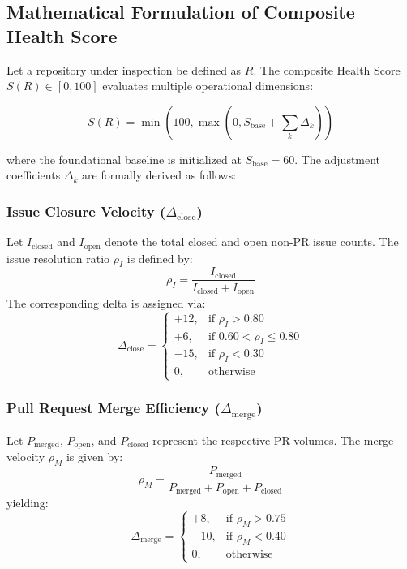\documentclass[conference]{IEEEtran}
\begin{document}
\subsection{Mathematical Formulation of Composite Health Score}
Let a repository under inspection be defined as $R$. The composite Health Score $S(R) \in [0, 100]$ evaluates multiple operational dimensions:

\begin{equation}
S(R) = \min\left(100, \max\left(0, S_{\text{base}} + \sum_{k} \Delta_k \right)\right)
\label{eq:health}
\end{equation}

where the foundational baseline is initialized at $S_{\text{base}} = 60$. The adjustment coefficients $\Delta_k$ are formally derived as follows:

\subsubsection{Issue Closure Velocity ($\Delta_{\text{close}}$)}
Let $I_{\text{closed}}$ and $I_{\text{open}}$ denote the total closed and open non-PR issue counts. The issue resolution ratio $\rho_I$ is defined by:
\begin{equation}
\rho_I = \frac{I_{\text{closed}}}{I_{\text{closed}} + I_{\text{open}}}
\end{equation}
The corresponding delta is assigned via:
\begin{equation}
\Delta_{\text{close}} = \begin{cases} 
+12, & \text{if } \rho_I > 0.80 \\
+6,  & \text{if } 0.60 < \rho_I \le 0.80 \\
-15, & \text{if } \rho_I < 0.30 \\
0,   & \text{otherwise}
\end{cases}
\end{equation}

\subsubsection{Pull Request Merge Efficiency ($\Delta_{\text{merge}}$)}
Let $P_{\text{merged}}$, $P_{\text{open}}$, and $P_{\text{closed}}$ represent the respective PR volumes. The merge velocity $\rho_M$ is given by:
\begin{equation}
\rho_M = \frac{P_{\text{merged}}}{P_{\text{merged}} + P_{\text{open}} + P_{\text{closed}}}
\end{equation}
yielding:
\begin{equation}
\Delta_{\text{merge}} = \begin{cases} 
+8,  & \text{if } \rho_M > 0.75 \\
-10, & \text{if } \rho_M < 0.40 \\
0,   & \text{otherwise}
\end{cases}
\end{equation}
\end{document}
